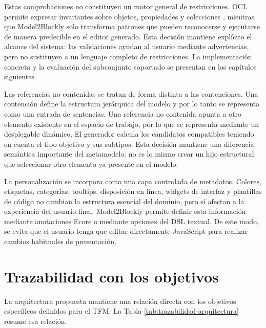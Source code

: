 Estas comprobaciones no constituyen un motor general de restricciones. OCL
permite expresar invariantes sobre objetos, propiedades y colecciones
\cite{omgOcl}, mientras que Model2Blockly solo transforma patrones que pueden
reconocerse y ejecutarse de manera predecible en el editor generado. Esta
decisión mantiene explícito el alcance del sistema: las validaciones ayudan al
usuario mediante advertencias, pero no sustituyen a un lenguaje completo de
restricciones. La implementación concreta y la evaluación del subconjunto
soportado se presentan en los capítulos siguientes.

Las referencias no contenidas se tratan de forma distinta a las contenciones.
Una contención define la estructura jerárquica del modelo y por lo tanto se
representa como una entrada de sentencias. Una referencia no contenida apunta a
otro elemento existente en el espacio de trabajo, por lo que se representa mediante un
desplegable dinámico. El generador calcula los candidatos compatibles teniendo
en cuenta el tipo objetivo y sus subtipos. Esta decisión mantiene una
diferencia semántica importante del metamodelo: no es lo mismo crear un hijo
estructural que seleccionar otro elemento ya presente en el modelo.

La personalización se incorpora como una capa controlada de metadatos. Colores,
etiquetas, categorías, tooltips, disposición en línea, widgets de interfaz y
plantillas de código no cambian la estructura esencial del dominio, pero sí
afectan a la experiencia del usuario final. Model2Blockly permite definir esta
información mediante anotaciones Ecore o mediante opciones del DSL textual. De
este modo, se evita que el usuario tenga que editar directamente JavaScript para
realizar cambios habituales de presentación.

\section{Trazabilidad con los objetivos}
\label{sec:trazabilidad-objetivos}

La arquitectura propuesta mantiene una relación directa con los objetivos
específicos definidos para el TFM. La Tabla
\ref{tab:trazabilidad-arquitectura} resume esa relación.

